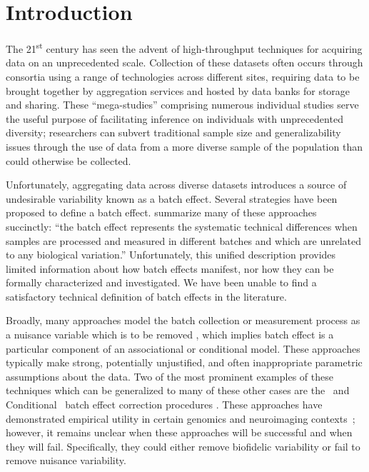 %
% 
\section{Introduction}

The 21\textsuperscript{st} century has seen the advent of high-throughput techniques for acquiring data on an unprecedented scale. Collection of these datasets often occurs through consortia using a range of technologies across different sites, requiring data to be brought together by aggregation services and hosted by data banks for storage and sharing. These ``mega-studies'' comprising numerous individual studies serve the useful purpose of facilitating inference on individuals with unprecedented diversity; researchers can subvert traditional sample size and generalizability issues through the use of data from a more diverse sample of the population than could otherwise be collected.

Unfortunately, aggregating data across diverse datasets introduces a source of undesirable variability known as a batch effect. Several strategies have been proposed to define a batch effect. \citet{Lazar2013Jul} summarize many of these approaches succinctly: ``the batch effect represents the systematic technical differences when samples are processed and measured in different batches and which are unrelated to any biological variation.'' Unfortunately, this unified description  provides limited information about how batch effects manifest, nor how they can be formally characterized and investigated. We have been unable to find a satisfactory technical definition of batch effects in the literature. 

{\color{black}Broadly, many approaches model the batch collection or measurement process as a nuisance variable which is to be removed \cite{Pearl2010Jul,Johnson2007Jan,Leek2010-ua,Leek2015-jc,Wachinger2020Feb,Yu2018Nov,Pomponio2020Mar}, which implies  batch effect is a particular component of an associational or conditional model. These approaches typically make strong, potentially unjustified, and often inappropriate parametric assumptions about the data. %
% 
Two of the most prominent examples of these techniques which can be generalized to many of these other cases are the \Combat~and Conditional \Combat~batch effect correction procedures \cite{Johnson2007Jan}. These approaches have demonstrated empirical utility in certain genomics and neuroimaging contexts~\cite{Zhang2020Sep,Pomponio2020Mar}; however, it remains unclear when these approaches will be successful and when they will fail. Specifically, they could either remove biofidelic variability or fail to remove nuisance variability. }



